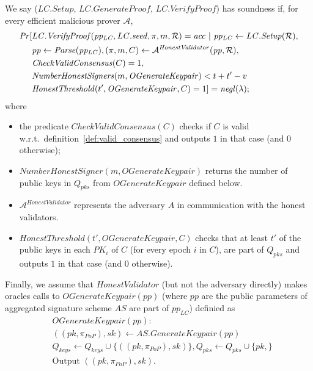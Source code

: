 We say ($\mathit{LC.Setup}$, $\mathit{LC.GenerateProof}$, $\mathit{LC.VerifyProof}$) has soundness if, 
for every efficient malicious prover $\mathcal{A}$,  
\begin{align*} 
\mathit{Pr}[&\mathit{LC.VerifyProof}(\mathit{pp_{\mathit{LC}}}, \LCseed, \pi, m, \mathcal{R}) = \mathit{acc} \ | \ \mathit{pp_{\mathit{LC}}} \leftarrow \mathit{LC.Setup}( \mathcal{R}), \\
& \mathit{pp} \leftarrow \mathit{Parse}(\mathit{pp_{LC}}), (\pi, m, C) \leftarrow \mathcal{A}^{\mathit{HonestValidator}}(\mathit{pp}, \mathcal{R}), \\
& \mathit{CheckValidConsensus}(C) =1, \\ 
& \mathit{NumberHonestSigners}(m,\mathit{OGenerateKeypair}) < t+t'-v \\
& \mathit{HonestThreshold}(t', \mathit{OGenerateKeypair}, C) = 1] = \negl({\lambda}); 
\end{align*}
\noindent where 
\begin{itemize}
\item the predicate $\mathit{CheckValidConsensus}(C)$ checks if $C$ is valid 
w.r.t.\ definition~\ref{def:valid_consensus} and outputs $1$ in that case (and $0$ otherwise); 
\item $\mathit{NumberHonestSigner}(m,\mathit{OGenerateKeypair})$ returns the number of public keys in $Q_{\mathit{pks}}$ from $\mathit{OGenerateKeypair}$ defined below.
\item $\mathcal{A}^{\mathit{HonestValidator}}$ represents the adversary $A$ in communication with the honest validators.
\item $\mathit{HonestThreshold}(t', \mathit{OGenerateKeypair}, C)$ checks 
that at least $t'$ of the public keys in each $\mathit{PK_i}$ of $C$ (for every epoch $i$ in $C$), are part of $Q_{\mathit{pks}}$ and outputs $1$ in 
that case (and $0$ otherwise). 
\end{itemize}
Finally, we assume that $\mathit{HonestValidator}$ (but not the adversary directly) makes oracles calls to $\mathit{OGenerateKeypair}(pp)$ (where $\mathit{pp}$ are the public parameters of aggregated signature scheme $\mathit{AS}$ are 
part of $\mathit{pp_{\mathit{LC}}}$) definied as
\begin{align*}
&\mathit{OGenerateKeypair}(pp): \\
& ((\mathit{pk}, \pi_{PoP}), \mathit{sk}) \leftarrow \mathit{AS.GenerateKeypair}(\mathit{pp}) \\
& Q_{\mathit{keys}} \leftarrow Q_{\mathit{keys}} \cup \{((\mathit{pk}, \pi_{PoP}), \mathit{sk})\}, Q_{\mathit{pks}} \leftarrow Q_{\mathit{pks}} \cup \{\mathit{pk},\}  \\
& \text{Output } ((\mathit{pk}, \pi_{PoP}), \mathit{sk}).
\end{align*}

